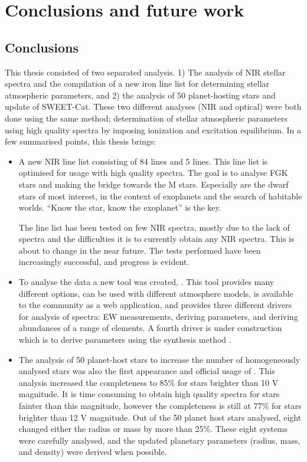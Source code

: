 \chapter{Conclusions and future work}
\label{cha:future}

\section{Conclusions}

This thesis consisted of two separated analysis. 1) The analysis of NIR stellar spectra and the
compilation of a new iron line list for determining stellar atmospheric parameters, and 2) the
analysis of 50 planet-hosting stars and update of SWEET-Cat. These two different analyses (NIR and
optical) were both done using the same method; determination of stellar atmospheric parameters using
high quality spectra by imposing ionization and excitation equilibrium. In a few summarised points,
this thesis brings:

\begin{itemize}
  \item A new NIR line list consisting of 84  lines and 5  lines. This line
        list is optimised for usage with high quality spectra. The goal is to analyse FGK stars and
        making the bridge towards the M stars. Especially are the dwarf stars of most interest, in
        the context of exoplanets and the search of habitable worlds. ``Know the star, know the
        exoplanet'' is the key.

        The line list has been tested on few NIR spectra, mostly due to the lack of spectra and the
        difficulties it is to currently obtain any NIR spectra. This is about to change in the
        near future. The tests performed have been increasingly successful, and progress is evident.
  \item To analyse the data a new tool was created, . This tool provides many different
        options, can be used with different atmosphere models, is available to the community as a
        web application, and provides three different drivers for analysis of spectra: EW
        measurements, deriving parameters, and deriving abundances of a range of elements. A fourth
        driver is under construction which is to derive parameters using the synthesis method
        \citep{Tsantaki2017}.
  \item The analysis of 50 planet-host stars to increase the number of homogeneously analysed stars
        was also the first appearance and official usage of . This analysis increased
        the completeness to 85\% for stars brighter than 10 V magnitude. It is time consuming to
        obtain high quality spectra for stars fainter than this magnitude, however the completeness
        is still at 77\% for stars brighter than 12 V magnitude. Out of the 50 planet host stars
        analysed, eight changed either the radius or mass by more than 25\%. These eight systems
        were carefully analysed, and the updated planetary parameters (radius, mass, and density)
        were derived when possible.
\end{itemize}



